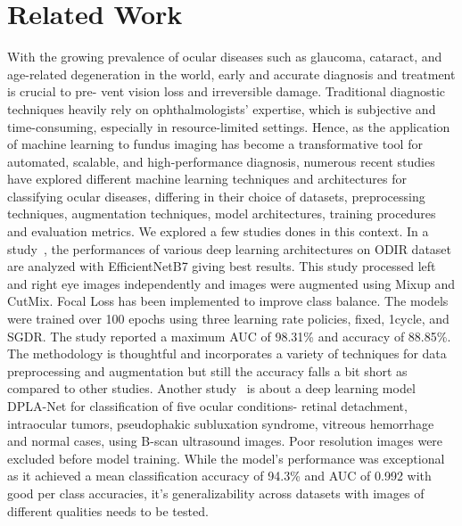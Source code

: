 \documentclass{ijclclp}
\begin{document}
\section{Related Work}\label{sec:relwork}
 \vspace{1em}
With the growing prevalence of ocular diseases such as glaucoma, cataract, and
age-related degeneration in the world, early and accurate diagnosis and treatment is crucial to pre-
vent vision loss and irreversible damage. Traditional diagnostic techniques heavily rely on ophthalmologists’ expertise, which is subjective and time-consuming, especially in resource-limited settings. Hence, as the application of machine learning to fundus imaging has become a transformative tool for automated, scalable, and high-performance diagnosis, numerous recent studies have explored different machine learning techniques and architectures for classifying ocular diseases, differing in their choice of datasets, preprocessing techniques, augmentation techniques, model architectures, training procedures and evaluation metrics. We explored a few studies dones in this context.
\newline
\newline
In a study~\cite{guergueb2021ocular}, the performances of various deep learning architectures on ODIR dataset are analyzed with EfficientNetB7 giving best results. This study processed left and right eye images independently and images were augmented using Mixup and CutMix. Focal Loss has been implemented to improve class balance. The models were trained over 100 epochs using three learning rate policies, fixed, 1cycle, and SGDR. The study reported a maximum AUC of 98.31\% and accuracy of 88.85\%. The methodology is thoughtful and incorporates a variety of techniques for data preprocessing and augmentation but still the accuracy falls a bit short as compared to other studies. Another study~\cite{ye2024ocular} is about a deep learning model DPLA-Net for classification of five ocular conditions- retinal detachment, intraocular tumors, pseudophakic subluxation syndrome, vitreous hemorrhage and normal cases, using B-scan ultrasound images. Poor resolution images were excluded before model training. While the model’s performance was exceptional as it achieved a mean classification accuracy of 94.3\% and AUC of 0.992 with good per class accuracies, it’s generalizability across datasets with images of different qualities needs to be tested. 
\newline
\newline
\end{document}
